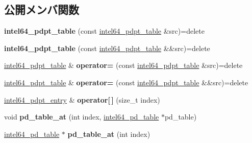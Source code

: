 \subsection*{公開メンバ関数}
\begin{DoxyCompactItemize}
\item 
\hypertarget{classintel64__pdpt__table_aa5679547ca3652a67ab58dad5280f7f4}{}{\bfseries intel64\+\_\+pdpt\+\_\+table} (const \hyperlink{classintel64__pdpt__table}{intel64\+\_\+pdpt\+\_\+table} \&src)=delete\label{classintel64__pdpt__table_aa5679547ca3652a67ab58dad5280f7f4}

\item 
\hypertarget{classintel64__pdpt__table_adef3862481b45bfc4f9e1bf3e592655e}{}{\bfseries intel64\+\_\+pdpt\+\_\+table} (const \hyperlink{classintel64__pdpt__table}{intel64\+\_\+pdpt\+\_\+table} \&\&src)=delete\label{classintel64__pdpt__table_adef3862481b45bfc4f9e1bf3e592655e}

\item 
\hypertarget{classintel64__pdpt__table_a8faa68e17a871f951674ca7c7d42a60c}{}\hyperlink{classintel64__pdpt__table}{intel64\+\_\+pdpt\+\_\+table} \& {\bfseries operator=} (const \hyperlink{classintel64__pdpt__table}{intel64\+\_\+pdpt\+\_\+table} \&src)=delete\label{classintel64__pdpt__table_a8faa68e17a871f951674ca7c7d42a60c}

\item 
\hypertarget{classintel64__pdpt__table_a6f2a9aa341261354835c89972c341007}{}\hyperlink{classintel64__pdpt__table}{intel64\+\_\+pdpt\+\_\+table} \& {\bfseries operator=} (const \hyperlink{classintel64__pdpt__table}{intel64\+\_\+pdpt\+\_\+table} \&\&src)=delete\label{classintel64__pdpt__table_a6f2a9aa341261354835c89972c341007}

\item 
\hypertarget{classintel64__pdpt__table_a6712cc312b62224c69b992e3773ac919}{}\hyperlink{classintel64__pdpt__entry}{intel64\+\_\+pdpt\+\_\+entry} \& {\bfseries operator\mbox{[}$\,$\mbox{]}} (size\+\_\+t index)\label{classintel64__pdpt__table_a6712cc312b62224c69b992e3773ac919}

\item 
\hypertarget{classintel64__pdpt__table_a94bd6a80ab20c8de937a4b6d608a6a92}{}void {\bfseries pd\+\_\+table\+\_\+at} (int index, \hyperlink{classintel64__pd__table}{intel64\+\_\+pd\+\_\+table} $\ast$pd\+\_\+table)\label{classintel64__pdpt__table_a94bd6a80ab20c8de937a4b6d608a6a92}

\item 
\hypertarget{classintel64__pdpt__table_a079c8439f4e7091d4a9b043574a185c6}{}\hyperlink{classintel64__pd__table}{intel64\+\_\+pd\+\_\+table} $\ast$ {\bfseries pd\+\_\+table\+\_\+at} (int index)\label{classintel64__pdpt__table_a079c8439f4e7091d4a9b043574a185c6}

\end{DoxyCompactItemize}
